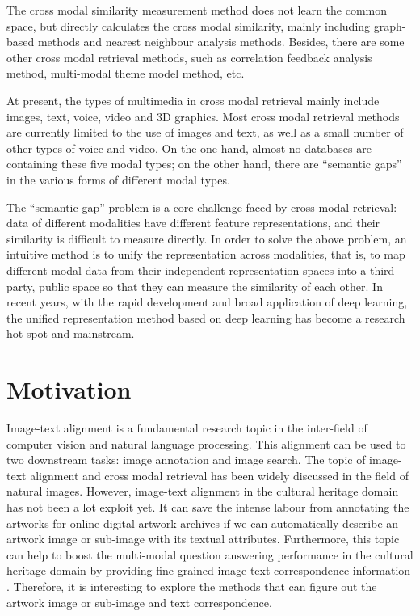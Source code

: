 The cross modal similarity measurement method does not learn the common space, but directly calculates the cross modal similarity, mainly including graph-based methods and nearest neighbour analysis methods. Besides, there are some other cross modal retrieval methods, such as correlation feedback analysis method, multi-modal theme model method, etc.

At present, the types of multimedia in cross modal retrieval mainly include images, text, voice, video and 3D graphics. Most cross modal retrieval methods are currently limited to the use of images and text, as well as a small number of other types of voice and video. On the one hand, almost no databases are containing these five modal types; on the other hand, there are ``semantic gaps'' in the various forms of different modal types.

The ``semantic gap'' problem is a core challenge faced by cross-modal retrieval: data of different modalities have different feature representations, and their similarity is difficult to measure directly. In order to solve the above problem, an intuitive method is to unify the representation across modalities, that is, to map different modal data from their independent representation spaces into a third-party, public space so that they can measure the similarity of each other. In recent years, with the rapid development and broad application of deep learning, the unified representation method based on deep learning has become a research hot spot and mainstream.

\section{Motivation}
Image-text alignment is a fundamental research topic in the inter-field of computer vision and natural language processing. This alignment can be used to two downstream tasks: image annotation and image search. The topic of image-text alignment and cross modal retrieval has been widely discussed in the field of natural images. However, image-text alignment in the cultural heritage domain has not been a lot exploit yet. It can save the intense labour from annotating the artworks for online digital artwork archives if we can automatically describe an artwork image or sub-image with its textual attributes. Furthermore, this topic can help to boost the multi-modal question answering performance in the cultural heritage domain by providing fine-grained image-text correspondence information \cite{mqa}. Therefore, it is interesting to explore the methods that can figure out the artwork image or sub-image and text correspondence.

